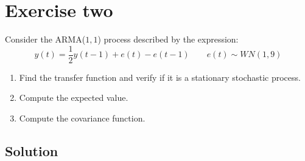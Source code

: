 \section{Exercise two}

Consider the ARMA($1,1$) process described by the expression: 
\[y(t)=\dfrac{1}{2}y(t-1)+e(t)-e(t-1) \qquad e(t)\sim WN(1,9)\]
\begin{enumerate}
    \item Find the transfer function and verify if it is a stationary stochastic process.
    \item Compute the expected value. 
    \item Compute the covariance function. 
\end{enumerate}


\subsection{Solution}

